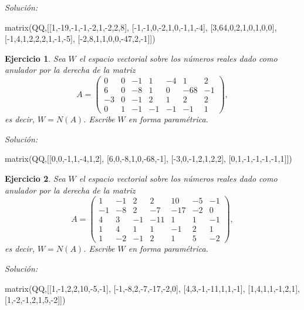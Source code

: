 \documentclass{amsart}
\newtheorem{ejer}{Ejercicio}
\begin{document}
{\it Soluci\'on:}

\begin{sageblock}
matrix(QQ,[[1,-19,-1,-1,-2,1,-2,2,8],
[-1,-1,0,-2,1,0,-1,1,-4],
[3,64,0,2,1,0,1,0,0],
[-1,4,1,2,2,2,1,-1,-5],
[-2,8,1,1,0,0,-47,2,-1]])
\end{sageblock}



\begin{ejer} Sea $W$ el espacio vectorial sobre los números reales dado
como anulador por la derecha de la matriz 
\[A = \left(\begin{array}{rrrrrrr}
0 & 0 & -1 & 1 & -4 & 1 & 2 \\
6 & 0 & -8 & 1 & 0 & -68 & -1 \\
-3 & 0 & -1 & 2 & 1 & 2 & 2 \\
0 & 1 & -1 & -1 & -1 & -1 & 1
\end{array}\right),\]
es decir, $W = N(A)$. Escribe $W$ en forma param\'etrica.
\end{ejer}

{\it Soluci\'on:}

\begin{sageblock}
matrix(QQ,[[0,0,-1,1,-4,1,2],
[6,0,-8,1,0,-68,-1],
[-3,0,-1,2,1,2,2],
[0,1,-1,-1,-1,-1,1]])
\end{sageblock}



\begin{ejer} Sea $W$ el espacio vectorial sobre los números reales dado
como anulador por la derecha de la matriz 
\[A = \left(\begin{array}{rrrrrrr}
1 & -1 & 2 & 2 & 10 & -5 & -1 \\
-1 & -8 & 2 & -7 & -17 & -2 & 0 \\
4 & 3 & -1 & -11 & 1 & 1 & -1 \\
1 & 4 & 1 & 1 & -1 & 2 & 1 \\
1 & -2 & -1 & 2 & 1 & 5 & -2
\end{array}\right),\]
es decir, $W = N(A)$. Escribe $W$ en forma param\'etrica.
\end{ejer}

{\it Soluci\'on:}

\begin{sageblock}
matrix(QQ,[[1,-1,2,2,10,-5,-1],
[-1,-8,2,-7,-17,-2,0],
[4,3,-1,-11,1,1,-1],
[1,4,1,1,-1,2,1],
[1,-2,-1,2,1,5,-2]])
\end{sageblock}

\end{document}
